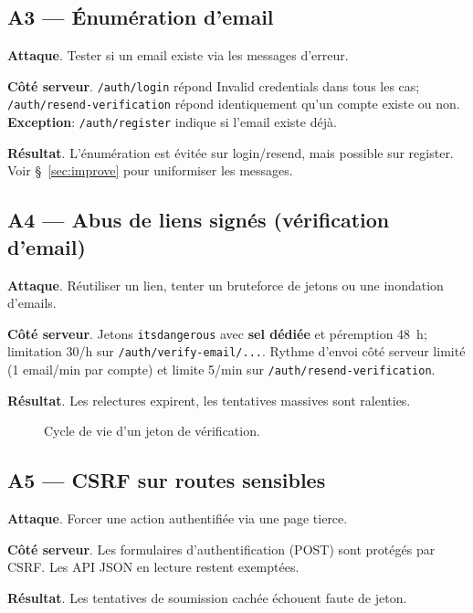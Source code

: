 \subsection*{A3 — Énumération d'email}
\textbf{Attaque}. Tester si un email existe via les messages d'erreur.

\textbf{Côté serveur}. \texttt{/auth/login} répond \og Invalid credentials \fg{} dans tous les cas; \texttt{/auth/resend-verification} répond identiquement qu'un compte existe ou non. \textbf{Exception}: \texttt{/auth/register} indique si l'email existe déjà.

\textbf{Résultat}. L'énumération est évitée sur login/resend, mais possible sur register. Voir \S~\ref{sec:improve} pour uniformiser les messages.

\subsection*{A4 — Abus de liens signés (vérification d'email)}
\textbf{Attaque}. Réutiliser un lien, tenter un bruteforce de jetons ou une inondation d'emails.

\textbf{Côté serveur}. Jetons \texttt{itsdangerous} avec \textbf{sel dédiée} et péremption 48~h; limitation 30/h sur \texttt{/auth/verify-email/...}. Rythme d'envoi côté serveur limité (1 email/min par compte) et limite 5/min sur \texttt{/auth/resend-verification}.

\textbf{Résultat}. Les relectures expirent, les tentatives massives sont ralenties.

\begin{figure}[h]
  \centering
  \caption{Cycle de vie d'un jeton de vérification.}
\end{figure}

\subsection*{A5 — CSRF sur routes sensibles}
\textbf{Attaque}. Forcer une action authentifiée via une page tierce.

\textbf{Côté serveur}. Les formulaires d'authentification (POST) sont protégés par CSRF. Les API JSON en lecture restent exemptées.

\textbf{Résultat}. Les tentatives de soumission cachée échouent faute de jeton.

